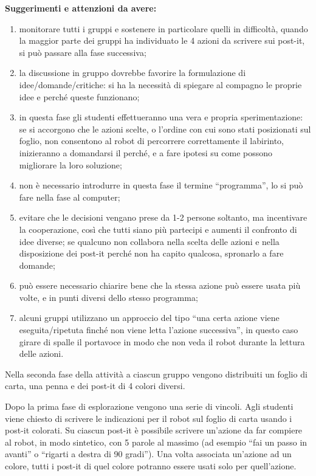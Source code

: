 \documentclass[12pt]{article}
\begin{document}
\textbf{Suggerimenti e attenzioni da avere:}
\begin{enumerate}
\item monitorare tutti i gruppi e sostenere in particolare quelli in difficoltà, quando la maggior parte dei gruppi ha individuato le 4 azioni da scrivere sui post-it, si può passare alla fase successiva;
\item la discussione in gruppo dovrebbe favorire la formulazione di idee/domande/critiche: si ha la necessità di spiegare al compagno le proprie idee e perché queste funzionano;
\item in questa fase gli studenti effettueranno una vera e propria sperimentazione: se si accorgono che le azioni scelte, o l’ordine con cui sono stati posizionati sul foglio, non consentono al robot di percorrere correttamente il labirinto, inizieranno a domandarsi il perché, e a fare ipotesi su come possono migliorare la loro soluzione;
\item non è necessario introdurre in questa fase il termine “programma”, lo si può fare nella fase al computer;
\item evitare che le decisioni vengano prese da 1-2 persone soltanto, ma incentivare la cooperazione, così che tutti siano più partecipi e aumenti il confronto di idee diverse; se qualcuno non collabora nella scelta delle azioni e nella disposizione dei post-it perché non ha capito qualcosa, spronarlo a fare domande;
\item può essere necessario chiarire bene che la stessa azione può essere usata più volte, e in punti diversi dello stesso programma;
\item alcuni gruppi utilizzano un approccio del tipo ``una certa azione viene eseguita/ripetuta finché non viene letta l'azione successiva'', in questo caso girare di spalle il portavoce in modo che non veda il robot durante la lettura delle azioni.
\end{enumerate}

Nella seconda fase della attività a ciascun gruppo vengono distribuiti un foglio di carta, una penna e dei post-it di 4 colori diversi.

Dopo la prima fase di esplorazione vengono una serie di vincoli. Agli studenti viene chiesto di scrivere le indicazioni per il robot sul foglio di carta usando i post-it colorati. Su ciascun post-it è possibile scrivere un’azione da far compiere al robot, in modo sintetico, con 5 parole al massimo (ad esempio ``fai un passo in avanti” o ``rigarti a destra di 90 gradi”). Una volta associata un’azione ad un colore, tutti  i post-it di quel colore potranno essere usati solo
per quell’azione.
\end{document}

